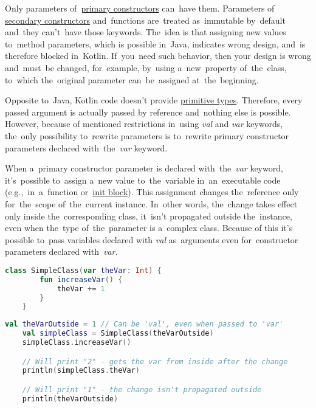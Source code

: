 \label{kotlinvalvar}
Only parameters of~\hyperref[kotlinprimaryconstructor]{primary constructors} can~have them.
Parameters of \hyperref[kotlinsecondaryconstructor]{secondary constructors} and~functions are~treated as~immutable
by~default and~they can't~have those keywords.
The~idea is that assigning new values to~method parameters, which is possible in~Java, indicates wrong design, and~is therefore blocked in~Kotlin.
If~you~need such behavior, then your design is wrong and~must~be changed, for~example, by~using a~new~property of~the~class, to~which the~original parameter can~be~assigned at~the~beginning.

Opposite to~Java, Kotlin code doesn't provide \hyperref[javaprimitivetypes]{primitive types}.
Therefore, every passed argument is actually passed by reference and~nothing else is possible.
However, because of mentioned restrictions in~using \textit{val} and \textit{var} keywords, the~only possibility to~rewrite parameters is to~rewrite primary constructor parameters declared \mbox{with the \textit{var}} keyword.

When a~primary constructor parameter is declared \mbox{with the \textit{var}} keyword, it's~possible to~assign a~new value to~the~variable in~an~executable code (e.g.,~in~a~function or~\hyperref[kotlininitblock]{init block}).
This assignment changes the~reference only for~the~scope of~the~current instance.
In~other words, the~change takes effect only inside the~corresponding class, it~isn't propagated outside the~instance, even when the~type of~the~parameter is a~complex class.
Because of this it's possible to~pass variables declared with \textit{val} as~arguments even for~constructor parameters declared \mbox{with \textit{var}.}

\example
\begin{lstlisting}[language=Kotlin, title={Class with \textit{var} parameter in the primary constructor}]
    class SimpleClass(var theVar: Int) {
        fun increaseVar() {
            theVar += 1
        }
    }
\end{lstlisting}
\newpage

\begin{lstlisting}[language=Kotlin, title={Behavior}]
    val theVarOutside = 1 // Can be 'val', even when passed to 'var'
    val simpleClass = SimpleClass(theVarOutside)
    simpleClass.increaseVar()

    // Will print "2" - gets the var from inside after the change
    println(simpleClass.theVar)

    // Will print "1" - the change isn't propagated outside
    println(theVarOutside)
\end{lstlisting}

